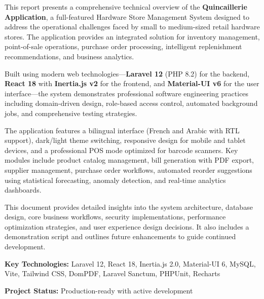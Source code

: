 \noindent
This report presents a comprehensive technical overview of the \textbf{Quincaillerie Application}, a full-featured Hardware Store Management System designed to address the operational challenges faced by small to medium-sized retail hardware stores. The application provides an integrated solution for inventory management, point-of-sale operations, purchase order processing, intelligent replenishment recommendations, and business analytics.

\vspace{0.3cm}

\noindent
Built using modern web technologies—\textbf{Laravel 12} (PHP 8.2) for the backend, \textbf{React 18} with \textbf{Inertia.js v2} for the frontend, and \textbf{Material-UI v6} for the user interface—the system demonstrates professional software engineering practices including domain-driven design, role-based access control, automated background jobs, and comprehensive testing strategies.

\vspace{0.3cm}

\noindent
The application features a bilingual interface (French and Arabic with RTL support), dark/light theme switching, responsive design for mobile and tablet devices, and a professional POS mode optimized for barcode scanners. Key modules include product catalog management, bill generation with PDF export, supplier management, purchase order workflows, automated reorder suggestions using statistical forecasting, anomaly detection, and real-time analytics dashboards.

\vspace{0.3cm}

\noindent
This document provides detailed insights into the system architecture, database design, core business workflows, security implementations, performance optimization strategies, and user experience design decisions. It also includes a demonstration script and outlines future enhancements to guide continued development.

\vspace{0.3cm}

\noindent
\textbf{Key Technologies:} Laravel 12, React 18, Inertia.js 2.0, Material-UI 6, MySQL, Vite, Tailwind CSS, DomPDF, Laravel Sanctum, PHPUnit, Recharts

\vspace{0.3cm}

\noindent
\textbf{Project Status:} Production-ready with active development
